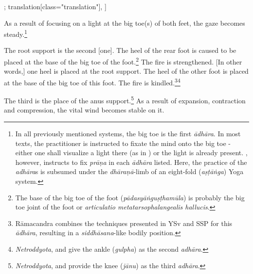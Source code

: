 \begin{alignment}[
  texts=edition[class="edition"];
  translation[class="translation"],
  ]
\begin{translation}
\begin{tlate}[p30_01]
     As a result of focusing on a light at the big toe(s) of both feet, the gaze becomes steady.\footnote{In all previously mentioned systems, the big toe is the first \textit{ādhāra}. In most texts, the practitioner is instructed to fixate the mind onto the big toe - either one shall visualize a light there (as in ) or the light is already present. , however, instructs to fix \textit{prāṇa} in each \textit{ādhāra} listed. Here, the practice of the \textit{adhāra}s is subsumed under the \textit{dhāraṇā}-limb of an eight-fold (\textit{aṣṭāṅga}) Yoga system.}
      
     The root support is the second [one]. The heel of the rear foot is caused to be placed at the base of the big toe of the foot.\footnote{The base of the big toe of the foot (\textit{pādasyāṅguṣṭhamūla}) is probably the big toe joint of the foot or \textit{articulatio metatarsophalangealis hallucis}.} The fire is strengthened.
     [In other words,] one heel is placed at the root support. The heel of the other foot is placed at the base of the big toe of this foot. The fire is kindled.\footnote{Rāmacandra combines the techniques presented in YSv and SSP for this \textit{ādhāra}, resulting in a \textit{siddhāsana}-like bodily position.}\footnote{\textit{Netroddyota},  and  give the ankle (\textit{gulpha}) as the second \textit{adhāra}.}
      
     The third is the place of the anus support.\footnote{\textit{Netroddyota},  and  provide the knee (\textit{jānu}) as the third \textit{adhāra}.} As a result of expansion, contraction and compression, the vital wind becomes stable on it.
    \end{tlate}
  \end{translation}
\end{alignment}
\pagebreak %
